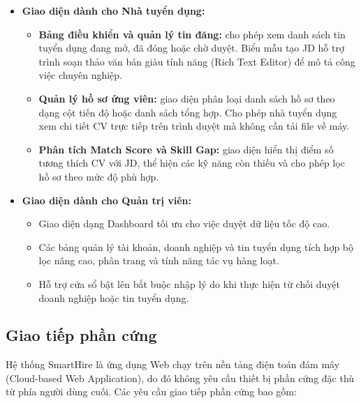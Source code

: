 \begin{itemize}
    \item \textbf{Giao diện dành cho Nhà tuyển dụng:}
    \begin{itemize}
        \item \textbf{Bảng điều khiển và quản lý tin đăng:} cho phép xem danh sách tin tuyển dụng đang mở, đã đóng hoặc chờ duyệt. Biểu mẫu tạo JD hỗ trợ trình soạn thảo văn bản giàu tính năng (Rich Text Editor) để mô tả công việc chuyên nghiệp.
        \item \textbf{Quản lý hồ sơ ứng viên:} giao diện phân loại danh sách hồ sơ theo dạng cột tiến độ hoặc danh sách tổng hợp. Cho phép nhà tuyển dụng xem chi tiết CV trực tiếp trên trình duyệt mà không cần tải file về máy.
        \item \textbf{Phân tích Match Score và Skill Gap:} giao diện hiển thị điểm số tương thích CV với JD, thể hiện các kỹ năng còn thiếu và cho phép lọc hồ sơ theo mức độ phù hợp.
    \end{itemize}

    \item \textbf{Giao diện dành cho Quản trị viên:}
    \begin{itemize}
        \item Giao diện dạng Dashboard tối ưu cho việc duyệt dữ liệu tốc độ cao.
        \item Các bảng quản lý tài khoản, doanh nghiệp và tin tuyển dụng tích hợp bộ lọc nâng cao, phân trang và tính năng tác vụ hàng loạt.
        \item Hỗ trợ cửa sổ bật lên bắt buộc nhập lý do khi thực hiện từ chối duyệt doanh nghiệp hoặc tin tuyển dụng.
    \end{itemize}
\end{itemize}

\subsection{Giao tiếp phần cứng}

Hệ thống SmartHire là ứng dụng Web chạy trên nền tảng điện toán đám mây (Cloud-based Web Application), do đó không yêu cầu thiết bị phần cứng đặc thù từ phía người dùng cuối. Các yêu cầu giao tiếp phần cứng bao gồm:

